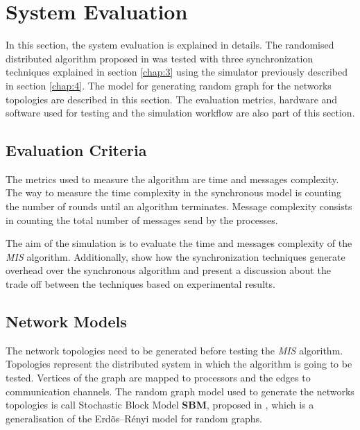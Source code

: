 \section{System Evaluation}
\label{chap:5}

In this section, the system evaluation is explained in details. The randomised distributed algorithm proposed in \cite{yves2009optimal} was tested with three synchronization techniques explained in section \ref{chap:3} using the simulator previously described in section \ref{chap:4}. The model for generating random graph for the networks topologies are described in this section. The evaluation metrics, hardware and software used for testing and the simulation workflow are also part of this section.  


\subsection{Evaluation Criteria}



The metrics used to measure the algorithm are time and  messages complexity. The way to measure the time complexity  in the synchronous model is counting the number of rounds until an algorithm terminates. Message complexity consists in counting the total number of messages send by the processes.

The aim of the simulation is to evaluate the time and messages complexity of the \textit{MIS} algorithm. Additionally, show how the synchronization techniques generate overhead over the synchronous algorithm and present a discussion about the trade off between the techniques based on experimental results.


\subsection{Network Models}
\label{sec:topology}


The network topologies need to be generated before testing the \textit{MIS} algorithm. Topologies represent the distributed system in which the algorithm is going to be tested. Vertices of the graph are mapped to processors and the edges to communication channels.  The random graph model used to generate the networks topologies is call Stochastic Block Model \textbf{SBM}, proposed in \cite{holland1983stochastic}, which is a generalisation of the Erd\~os--R\'enyi model for random graphs.

